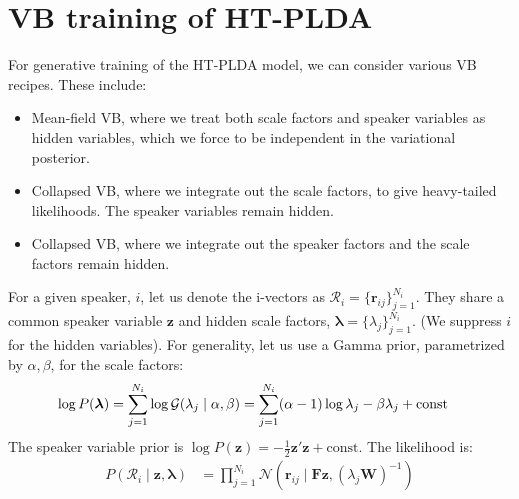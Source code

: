 \documentclass[a4paper,oneside,12pt,english]{report}
\def\lambdavec{\boldsymbol{\lambda}}
\def\zvec{\mathbf{z}}
\def\ND{\mathcal{N}}
\def\Wmat{\mathbf{W}}
\def\Fmat{\mathbf{F}}
\def\rvec{\mathbf{r}}
\def\Rset{\mathcal{R}}
\def\const{\text{const}}
\begin{document}
\section{VB training of HT-PLDA}
For generative training of the HT-PLDA model, we can consider various VB recipes. These include: 
\begin{itemize}
	\item Mean-field VB, where we treat both scale factors and speaker variables as hidden variables, which we force to be independent in the variational posterior.
	\item Collapsed VB, where we integrate out the scale factors, to give heavy-tailed likelihoods. The speaker variables remain hidden. 
  \item Collapsed VB, where we integrate out the speaker factors and the scale factors remain hidden. 
\end{itemize}
For a given speaker, $i$, let us denote the i-vectors as $\Rset_i=\{\rvec_{ij}\}_{j=1}^{N_i}$. They share a common speaker variable $\zvec$ and hidden scale factors, $\lambdavec = \{\lambda_j\}_{j=1}^{N_i}$. (We suppress $i$ for the hidden variables). For generality, let us use a Gamma prior, parametrized by $\alpha,\beta$, for the scale factors:
\begin{align}
\log P(\lambdavec) &= \sum_{j=1}^{N_i}\log\GD(\lambda_j\mid\alpha,\beta) 
= \sum_{j=1}^{N_i} (\alpha-1)\log\lambda_j -\beta\lambda_j + \const
\end{align} 
The speaker variable prior is $\log P(\zvec)=-\frac12\zvec'\zvec + \const$. The likelihood is:
\begin{align}
P(\Rset_i\mid\zvec,\lambdavec) &= \prod_{j=1}^{N_i} \ND(\rvec_{ij}\mid \Fmat\zvec,(\lambda_j\Wmat)^{-1})
\end{align}
\end{document}
